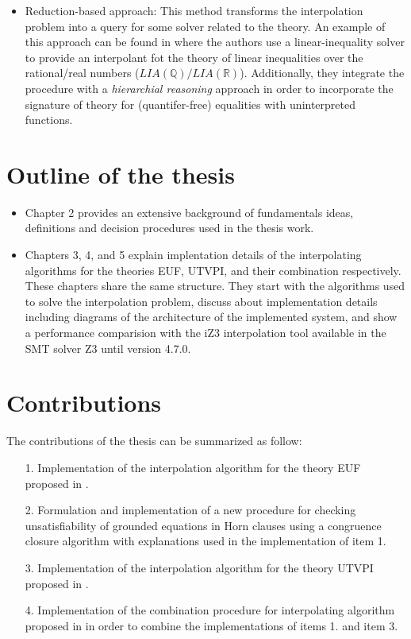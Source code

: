 \begin{itemize}
  \item Reduction-based approach: This method transforms the interpolation
    problem into a query for some solver related to the theory. 
    An example of this approach can be found in \cite{10.1007/978-3-540-69738-1_25}
    where the authors use a linear-inequality solver to provide an interpolant
    fot the theory of linear inequalities over the rational/real numbers 
    ($LIA(\mathbb{Q})/LIA(\mathbb{R})$). 
    Additionally, they integrate the procedure with a 
    \emph{hierarchial reasoning} approach in order to incorporate 
    the signature of theory for (quantifer-free) equalities with uninterpreted 
    functions.
\end{itemize}

\section{Outline of the thesis}

\begin{itemize}
  \item Chapter 2 provides an extensive background 
    of fundamentals ideas, definitions and decision procedures 
    used in the thesis work.
  \item Chapters 3, 4, and 5 explain implentation details
    of the interpolating algorithms for the theories
    EUF, UTVPI, and their combination respectively. These
    chapters share the same structure. They start with the
    algorithms used to solve the interpolation problem, discuss
    about implementation details including diagrams
    of the architecture of the implemented system, and 
    show a performance comparision with the iZ3 interpolation 
    tool available in the SMT solver Z3 until version 4.7.0.
\end{itemize} 

\section{Contributions}

The contributions of the thesis can be summarized as follow:

\begin{itemize}
  \item[1.] Implementation of the interpolation algorithm for the theory EUF 
    proposed in \cite{KAPUR2017}.
  \item[2.] Formulation and implementation of a new 
    procedure for checking unsatisfiability of grounded equations in 
    Horn clauses using a congruence closure algorithm with explanations
    used in the implementation of item 1.
  \item[3.] Implementation of the interpolation algorithm for the theory UTVPI
    proposed in \cite{KAPUR2017}.
  \item[4.] Implementation of the combination procedure for interpolating
    algorithm proposed in \cite{10.1007/11532231_26} in order to 
    combine the implementations of items 1. and item 3.
\end{itemize}

